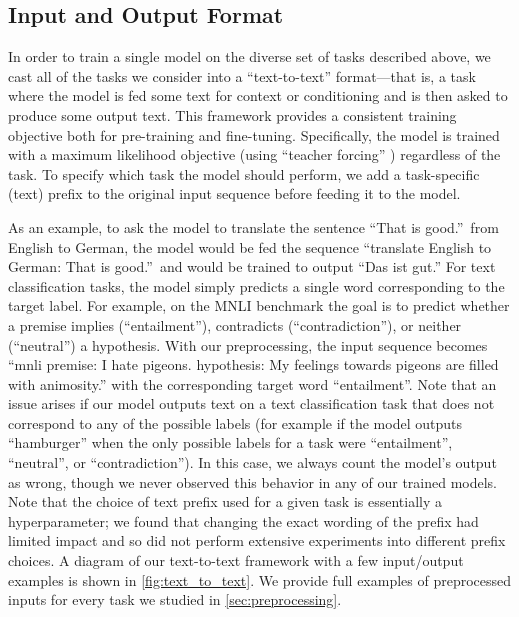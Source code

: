 \documentclass[twoside,11pt]{article}
\begin{document}
\subsection{Input and Output Format}
\label{sec:format}

In order to train a single model on the diverse set of tasks described above, we cast all of the tasks we consider into a ``text-to-text'' format---that is, a task where the model is fed some text for context or conditioning and is then asked to produce some output text.
This framework provides a consistent training objective both for pre-training and fine-tuning.
Specifically, the model is trained with a maximum likelihood objective (using ``teacher forcing'' \citep{williams1989learning}) regardless of the task.
To specify which task the model should perform, we add a task-specific (text) prefix to the original input sequence before feeding it to the model.

As an example, to ask the model to translate the sentence ``That is good.''\ from English to German, the model would be fed the sequence ``translate English to German: That is good.''\ and would be trained to output ``Das ist gut.''
For text classification tasks, the model simply predicts a single word corresponding to the target label.
For example, on the MNLI benchmark \citep{williams2017broad} the goal is to predict whether a premise implies (``entailment''), contradicts (``contradiction''), or neither (``neutral'') a hypothesis.
With our preprocessing, the input sequence becomes ``mnli premise: I hate pigeons. hypothesis: My feelings towards pigeons are filled with animosity.'' with the corresponding target word ``entailment''.
Note that an issue arises if our model outputs text on a text classification task that does not correspond to any of the possible labels (for example if the model outputs ``hamburger'' when the only possible labels for a task were ``entailment'', ``neutral'', or ``contradiction'').
In this case, we always count the model's output as wrong, though we never observed this behavior in any of our trained models.
Note that the choice of text prefix used for a given task is essentially a hyperparameter; we found that changing the exact wording of the prefix had limited impact and so did not perform extensive experiments into different prefix choices.
A diagram of our text-to-text framework with a few input/output examples is shown in \cref{fig:text_to_text}.
We provide full examples of preprocessed inputs for every task we studied in \cref{sec:preprocessing}.
\end{document}
